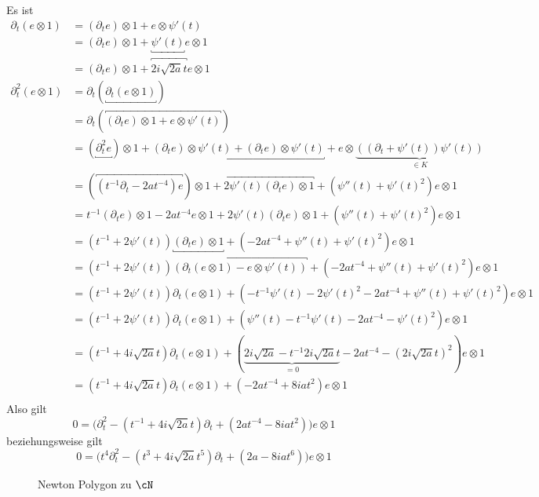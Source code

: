 \begin{try}
Es ist
\begin{align*}
\partial_t(e\otimes 1) &= (\partial_te)\otimes 1 + e\otimes \psi'(t) \\
  &= (\partial_te)\otimes 1 + \underbracket{\psi'(t)} e\otimes 1 \\
  &= (\partial_te)\otimes 1 + \overbracket{2i\sqrt{2a}t} e\otimes 1 \\
\partial_t^2(e\otimes 1)
  &= \partial_t(\underbracket{\partial_t(e\otimes 1)})\\
  &= \partial_t(\overbracket{(\partial_te)\otimes 1
    + e\otimes \psi'(t)})\\
  &= (\underbracket{\partial_t^2 e})\otimes 1
    + \underbracket{(\partial_t e)\otimes \psi'(t)
    +               (\partial_t e)\otimes \psi'(t)}
    + e\otimes\underset{\in K}{\underbrace{((\partial_t+\psi'(t))\psi'(t))}}\\
  &= (\overbracket{(t^{-1}\partial_t - 2at^{-4}) e})\otimes 1
    + \overbracket{2\psi'(t) (\partial_t e)\otimes 1}
    + (\psi''(t) + \psi'(t)^2)e\otimes 1\\
  &= t^{-1}(\partial_t  e)\otimes 1
    - 2at^{-4} e\otimes 1
    + 2\psi'(t) (\partial_t e)\otimes 1
    + (\psi''(t) + \psi'(t)^2)e\otimes 1\\
  &= (t^{-1} + 2\psi'(t)) \underbracket{(\partial_t e)\otimes 1}
    + (- 2at^{-4} + \psi''(t) + \psi'(t)^2)e\otimes 1\\
  &= (t^{-1} + 2\psi'(t)) \overbracket{(\partial_t (e\otimes 1)
    - e\otimes \psi'(t))}
    + (- 2at^{-4} + \psi''(t) + \psi'(t)^2)e\otimes 1\\
  &= (t^{-1} + 2\psi'(t)) \partial_t (e\otimes 1)
    + (- t^{-1}\psi'(t) - 2\psi'(t)^2
    - 2at^{-4} + \psi''(t) + \psi'(t)^2)e\otimes 1\\
  &= (t^{-1} + 2\psi'(t)) \partial_t (e\otimes 1)
    + (\psi''(t) - t^{-1}\psi'(t) - 2at^{-4} - \psi'(t)^2)e\otimes 1\\
  &= (t^{-1} + 4i\sqrt{2a}t) \partial_t (e\otimes 1)
    + (\underset{=0}{\underbrace{2i\sqrt{2a} - t^{-1}2i\sqrt{2a}t}}
    - 2at^{-4} - (2i\sqrt{2a}t)^2)e\otimes 1\\
  &= (t^{-1} + 4i\sqrt{2a}t) \partial_t (e\otimes 1)
    + ( - 2at^{-4} + 8iat^2)e\otimes 1\\
\end{align*}
Also gilt
\[
0 = \Big( \partial_t^2 - (t^{-1} + 4i\sqrt{2a}t) \partial_t
  + ( 2at^{-4} - 8iat^2)\Big) e\otimes 1
\]
beziehungsweise gilt
\[
0 = \Big( t^4\partial_t^2 - (t^{3} + 4i\sqrt{2a}t^5) \partial_t
  + ( 2a - 8iat^6)\Big) e\otimes 1
\]
\begin{figure}[H]
\caption{Newton Polygon zu $\cN$}
\begin{center}
\end{center}
\end{figure}
\end{try}
